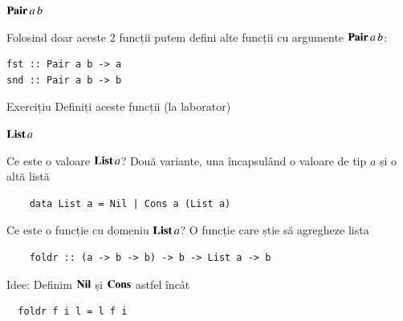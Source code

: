 \documentclass[xcolor=pdftex,romanian,colorlinks]{beamer}
\begin{document}
\begin{frame}[fragile]{$\mathop{\mathop{\mathbf{Pair}}{a}}{b}$}

\begin{center}
  \hfill
\end{center}

Folosind doar aceste 2 funcții putem defini alte funcții cu argumente $\mathop{\mathop{\mathbf{Pair}}{a}}{b}$:

\begin{lstlisting}
fst :: Pair a b -> a
snd :: Pair a b -> b
\end{lstlisting}

\begin{alertblock}{Exercițiu}
Definiți aceste funcții (la laborator)
\end{alertblock}
\end{frame}

\begin{frame}[fragile]{$\mathop{\mathbf{List}}{a}$}

\begin{block}{Ce este o valoare $\mathop{\mathbf{List}}{a}$?}
		Două variante, una încapsulând o valoare de tip $a$ și o altă listă
	\begin{lstlisting}
	data List a = Nil | Cons a (List a)
	\end{lstlisting}
\end{block}

\begin{block}{Ce este o funcție cu domeniu $\mathop{\mathbf{List}}{a}$?}
		O funcție care știe să agregheze lista
	\begin{lstlisting}
	foldr :: (a -> b -> b) -> b -> List a -> b
	\end{lstlisting}
\end{block}

\begin{block}{Idee:
	Definim $\mathbf{Nil}$ și $\mathbf{Cons}$ astfel încât}
	\begin{lstlisting}
  foldr f i l = l f i
	\end{lstlisting}
\end{block}
\end{frame}
\end{document}
